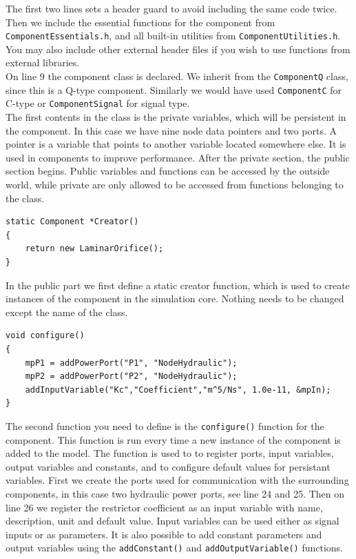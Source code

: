 \documentclass[a4paper,pdftex]{article}
\begin{document}
\noindent The first two lines sets a header guard to avoid including the same code twice. 
Then we include the essential functions for the component from \texttt{ComponentEssentials.h}, and all built-in utilities from \texttt{ComponentUtilities.h}.
You may also include other external header files if you wish to use functions from external libraries.\\
\newline
On line 9 the component class is declared. 
We inherit from the \texttt{ComponentQ} class, since this is a Q-type component. 
Similarly we would have used \texttt{ComponentC} for C-type or \texttt{ComponentSignal} for signal type.\\ 
\newline
The first contents in the class is the private variables, which will be persistent in the component. 
In this case we have nine node data pointers and two ports.
A pointer is a variable that points to another variable located somewhere else.
It is used in components to improve performance.
After the private section, the public section begins. 
Public variables and functions can be accessed by the outside world, while private are only allowed to be accessed from functions belonging to the class.

\begin{minipage}{\linewidth}
\begin{lstlisting}[firstnumber=18, basicstyle=\footnotesize\ttfamily]
static Component *Creator()
{
    return new LaminarOrifice();
}
\end{lstlisting}
\end{minipage}

\noindent In the public part we first define a static creator function, which is used to create instances of the component in the simulation core. 
Nothing needs to be changed except the name of the class.

\begin{minipage}{\linewidth}
\begin{lstlisting}[firstnumber=22, basicstyle=\footnotesize\ttfamily]
void configure()
{
    mpP1 = addPowerPort("P1", "NodeHydraulic");
    mpP2 = addPowerPort("P2", "NodeHydraulic");
    addInputVariable("Kc","Coefficient","m^5/Ns", 1.0e-11, &mpIn);
}
\end{lstlisting}
\end{minipage}
\noindent The second function you need to define is the \texttt{configure()} function for the component. 
This function is run every time a new instance of the component is added to the model. 
The function is used to to register ports, input variables, output variables and constants, and to configure default values for persistant variables. 
First we create the ports used for communication with the surrounding components, in this case two hydraulic power ports, see line 24 and 25. 
Then on line 26 we register the restrictor coefficient as an input variable with name, description, unit and default value. 
Input variables can be used either as signal inputs or as parameters.
It is also possible to add constant parameters and output variables using the \texttt{addConstant()} and \texttt{addOutputVariable()} functions.
\end{document}
